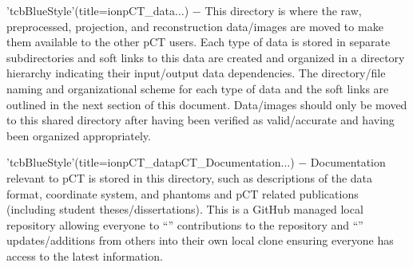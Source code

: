 \begin{tcbfunctionenv}
\begin{tcbparagraph}
\end{tcbparagraph}
\begin{tcbparagraph}'tcbBlueStyle'(title=\dirsep ion\dirsep pCT\_data\dirsep$\dots$)
$\boldsymbol{-}$ This directory is where the raw, preprocessed, projection, and reconstruction data/images are moved to make them available to the other pCT users.  Each type of data is stored in separate subdirectories and soft links to this data are created and organized in a directory hierarchy indicating their input/output data dependencies.  The directory/file naming and organizational scheme for each type of data and the soft links are outlined in the next section of this document.  Data/images should only be moved to this shared directory after having been verified as valid/accurate and having been organized appropriately.
\end{tcbparagraph}
\begin{tcbparagraph}'tcbBlueStyle'(title=\dirsep ion\dirsep pCT\_data\dirsep pCT\_Documentation\dirsep $\dots$)
$\boldsymbol{-}$ Documentation relevant to pCT is stored in this directory, such as descriptions of the data format, coordinate system, and phantoms and pCT related publications (including student theses/dissertations).  This is a GitHub managed local repository allowing everyone to ``'' contributions to the repository and ``'' updates/additions from others into their own local clone ensuring everyone has access to the latest information.

\end{tcbparagraph}
\end{tcbfunctionenv}
